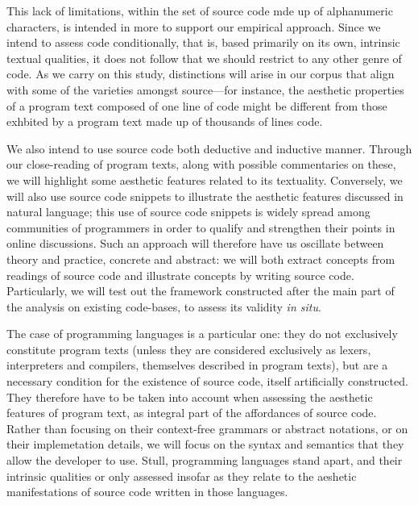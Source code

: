 This lack of limitations, within the set of source code mde up of alphanumeric characters, is intended in more to support our empirical approach. Since we intend to assess code conditionally, that is, based primarily on its own, intrinsic textual qualities, it does not follow that we should restrict to any other genre of code. As we carry on this study, distinctions will arise in our corpus that align with some of the varieties amongst source—for instance, the aesthetic properties of a program text composed of one line of code might be different from those exhbited by a program text made up of thousands of lines code.

We also intend to use source code both deductive and inductive manner. Through our close-reading of program texts, along with possible commentaries on these, we will highlight some aesthetic features related to its textuality. Conversely, we will also use source code snippets to illustrate the aesthetic features discussed in natural language; this use of source code snippets is widely spread among communities of programmers in order to qualify and strengthen their points in online discussions. Such an approach will therefore have us oscillate between theory and practice, concrete and abstract: we will both extract concepts from readings of source code and illustrate concepts by writing source code. Particularly, we will test out the framework constructed after the main part of the analysis on existing code-bases, to assess its validity \emph{in situ}.

The case of programming languages is a particular one: they do not exclusively constitute program texts (unless they are considered exclusively as lexers, interpreters and compilers, themselves described in program texts), but are a necessary condition for the existence of source code, itself artificially constructed. They therefore have to be taken into account when assessing the aesthetic features of program text, as integral part of the affordances of source code. Rather than focusing on their context-free grammars or abstract notations, or on their implemetation details, we will focus on the syntax and semantics that they allow the developer to use. Stull, programming languages stand apart, and their intrinsic qualities or only assessed insofar as they relate to the aeshetic manifestations of source code written in those languages.

